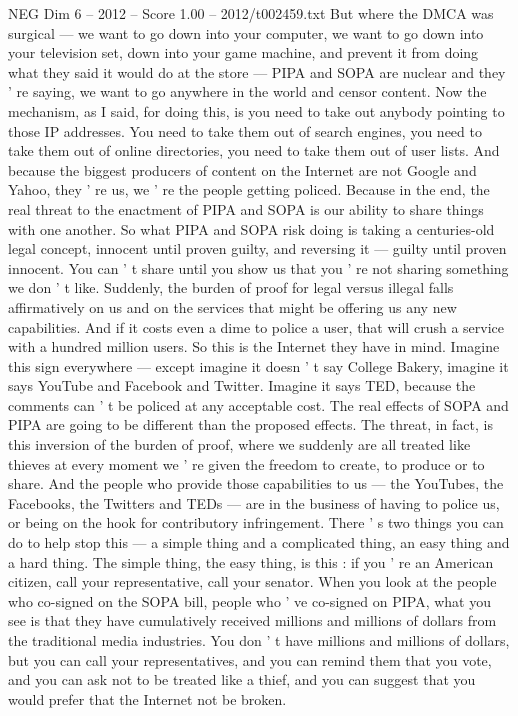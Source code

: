 \begin{textsample}{NEG Dim 6 – 2012 – Score 1.00 – 2012/t002459.txt}
But where the DMCA was surgical — we want to go down into your computer, we want to go down into your television set, down into your game machine, and prevent it from doing what they said it would do at the store — PIPA and SOPA are nuclear and they ' re saying, we want to go anywhere in the world and censor content.
Now the mechanism, as I said, for doing this, is you need to take out anybody pointing to those IP addresses.
You need to take them out of search engines, you need to take them out of online directories, you need to take them out of user lists.
And because the biggest producers of content on the Internet are not Google and Yahoo, they ' re us, we ' re the people getting policed.
Because in the end, the real threat to the enactment of PIPA and SOPA is our ability to share things with one another.
So what PIPA and SOPA risk doing is taking a centuries-old legal concept, innocent until proven guilty, and reversing it — guilty until proven innocent.
You can ' t share until you show us that you ' re not sharing something we don ' t like.
Suddenly, the burden of proof for legal versus illegal falls affirmatively on us and on the services that might be offering us any new capabilities.
And if it costs even a dime to police a user, that will crush a service with a hundred million users.
So this is the Internet they have in mind.
Imagine this sign everywhere — except imagine it doesn ' t say College Bakery, imagine it says YouTube and Facebook and Twitter.
Imagine it says TED, because the comments can ' t be policed at any acceptable cost.
The real effects of SOPA and PIPA are going to be different than the proposed effects.
The threat, in fact, is this inversion of the burden of proof, where we suddenly are all treated like thieves at every moment we ' re given the freedom to create, to produce or to share.
And the people who provide those capabilities to us — the YouTubes, the Facebooks, the Twitters and TEDs — are in the business of having to police us, or being on the hook for contributory infringement.
There ' s two things you can do to help stop this — a simple thing and a complicated thing, an easy thing and a hard thing.
The simple thing, the easy thing, is this : if you ' re an American citizen, call your representative, call your senator.
When you look at the people who co-signed on the SOPA bill, people who ' ve co-signed on PIPA, what you see is that they have cumulatively received millions and millions of dollars from the traditional media industries.
You don ' t have millions and millions of dollars, but you can call your representatives, and you can remind them that you vote, and you can ask not to be treated like a thief, and you can suggest that you would prefer that the Internet not be broken.

\end{textsample}
